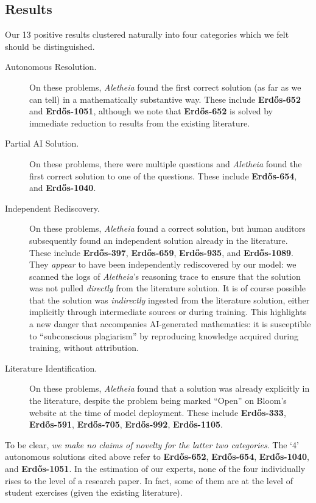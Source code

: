 \documentclass{article}
\theoremstyle{plain}
\theoremstyle{definition}
\newcommand{\Aletheia}{\emph{Aletheia}}
\begin{document}
 \subsection{Results}\label{ssec:results} Our 13 positive results clustered naturally into four categories which we felt should be distinguished.
\begin{description}
    \item[Autonomous Resolution.] On these problems, {\Aletheia} found the first correct solution (as far as we can tell) in a mathematically substantive way. These include  \textbf{Erd\H{o}s-652} and \textbf{Erd\H{o}s-1051}, although we note that \textbf{Erd\H{o}s-652} is solved by immediate reduction to results from the existing literature.
    \item[Partial AI Solution.] On these problems, there were multiple questions and {\Aletheia} found the first correct solution to one of the questions. These include \textbf{Erd\H{o}s-654}, and \textbf{Erd\H{o}s-1040}. 
    \item[Independent Rediscovery.] On these problems, {\Aletheia} found a correct solution, but human auditors subsequently found an independent solution already in the literature. These include \textbf{Erd\H{o}s-397}, \textbf{Erd\H{o}s-659}, \textbf{Erd\H{o}s-935}, and \textbf{Erd\H{o}s-1089}. They \emph{appear} to have been independently rediscovered by our model: we scanned the logs of \Aletheia's reasoning trace to ensure that the solution was not pulled \emph{directly} from the literature solution. It is of course possible that the solution was \emph{indirectly} ingested from the literature solution, either implicitly through intermediate sources or during training. This highlights a new danger that accompanies AI-generated mathematics: it is susceptible to ``subconscious plagiarism'' by reproducing knowledge acquired during training, without attribution. 
    \item[Literature Identification.] On these problems, {\Aletheia} found that a solution was already explicitly in the literature, despite the problem being marked ``Open'' on Bloom's website at the time of model deployment. These include \textbf{Erd\H{o}s-333}, \textbf{Erd\H{o}s-591}, \textbf{Erd\H{o}s-705}, \textbf{Erd\H{o}s-992}, \textbf{Erd\H{o}s-1105}. 
\end{description}
To be clear, \emph{we make no claims of novelty for the latter two categories}. The `4' autonomous solutions cited above refer to \textbf{Erd\H{o}s-652}, \textbf{Erd\H{o}s-654}, \textbf{Erd\H{o}s-1040}, and \textbf{Erd\H{o}s-1051}. In the estimation of our experts, none of the four individually rises to the level of a research paper. In fact, some of them are at the level of student exercises (given the existing literature). 
\end{document}
